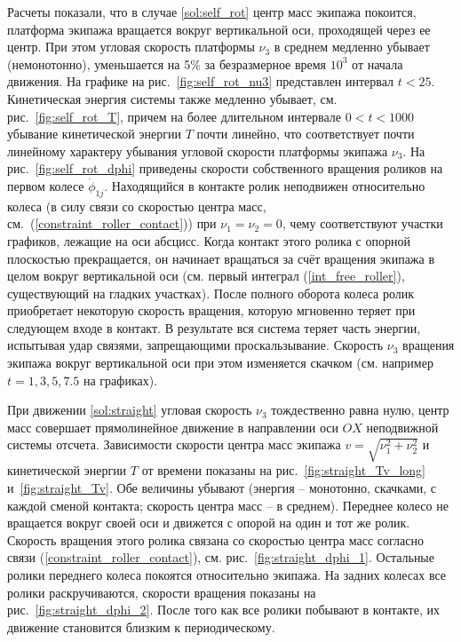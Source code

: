 Расчеты показали, что в случае \ref{sol:self_rot} центр масс экипажа покоится, платформа экипажа вращается вокруг вертикальной оси, проходящей через ее центр. При этом угловая скорость платформы $\nu_3$ в среднем медленно убывает (немонотонно), уменьшается на 5\%  за безразмерное время $10^3$ от начала движения. На графике на рис.~\ref{fig:self_rot_nu3} представлен интервал $t < 25$.  Кинетическая энергия системы также медленно убывает, см. рис.~\ref{fig:self_rot_T}, причем на более длительном интервале $0 < t < 1000$ убывание кинетической энергии $T$ почти линейно, что соответствует почти линейному характеру убывания угловой скорости платформы экипажа $\nu_3$. На рис.~\ref{fig:self_rot_dphi} приведены скорости собственного вращения роликов на первом колесе $\dot{\phi}_{1j}$. Находящийся в контакте ролик неподвижен относительно колеса (в силу связи со скоростью центра масс, см.~(\ref{constraint_roller_contact})) при $\nu_1 = \nu_2 = 0$, чему соответствуют участки графиков, лежащие на оси абсцисс. Когда контакт этого ролика с опорной плоскостью прекращается, он начинает вращаться за счёт вращения экипажа в целом вокруг вертикальной оси (см. первый интеграл (\ref{int_free_roller}), существующий на гладких участках). После полного оборота колеса ролик приобретает некоторую скорость вращения, которую мгновенно теряет при следующем входе в контакт. В результате вся система теряет часть энергии, испытывая удар связями, запрещающими проскальзывание. Скорость $\nu_3$ вращения экипажа вокруг вертикальной оси при этом изменяется скачком (см. например $t=1, 3, 5, 7.5$ на графиках).

При движении \ref{sol:straight} угловая скорость $\nu_3$ тождественно равна нулю, центр масс совершает прямолинейное движение в направлении оси $OX$ неподвижной системы отсчета. Зависимости скорости центра масс экипажа $v = \sqrt{\nu_1^2+\nu_2^2}$ и кинетической энергии $T$ от времени показаны на рис.~\ref{fig:straight_Tv_long} и~\ref{fig:straight_Tv}. Обе величины убывают (энергия -- монотонно, скачками, с каждой сменой контакта; скорость центра масс -- в среднем). Переднее колесо не вращается вокруг своей оси и движется с опорой на один и тот же ролик. Скорость вращения этого ролика связана со скоростью центра масс согласно связи (\ref{constraint_roller_contact}), см. рис.~\ref{fig:straight_dphi_1}. Остальные ролики переднего колеса покоятся относительно экипажа. На задних колесах все ролики раскручиваются, скорости вращения показаны на рис.~\ref{fig:straight_dphi_2}. После того как все ролики побывают в контакте, их движение становится близким к периодическому.

